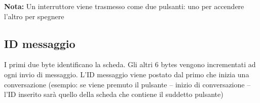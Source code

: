 \documentclass[italian]{article}
\begin{document}
%        
%        
%                
%        
%       
    
    \textbf{Nota:} Un interruttore viene trasmesso come due pulsanti: uno per accendere l'altro per spegnere
    
    \subsection*{ID messaggio}
    
    I primi due byte identificano la scheda. Gli altri 6 bytes vengono incrementati ad ogni invio di messaggio. L'ID messaggio viene postato dal primo che inizia una conversazione (esempio: se viene premuto il pulsante -- inizio di conversazione -- l'ID inserito sarà quello della scheda che contiene il suddetto pulsante)
    
\end{document}
